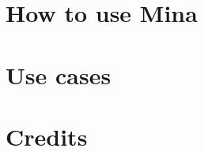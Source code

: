 \documentclass[10pt, a4paper]{article}
\begin{document}
\section{How to use Mina}
\section{Use cases}
\section{Credits}
\end{document}
